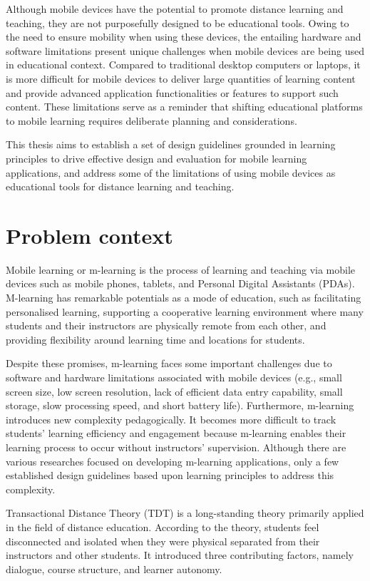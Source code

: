 Although mobile devices have the potential to promote distance learning and teaching, they are not purposefully designed to be educational tools. Owing to the need to ensure mobility when using these devices, the entailing hardware and software limitations present unique challenges when mobile devices are being used in educational context. Compared to traditional desktop computers or laptops, it is more difficult for mobile devices to deliver large quantities of learning content and provide advanced application functionalities or features to support such content. These limitations serve as a reminder that shifting educational platforms to mobile learning requires deliberate planning and considerations. 

This thesis aims to establish a set of design guidelines grounded in learning principles to drive effective design and evaluation for mobile learning applications, and address some of the limitations of using mobile devices as educational tools for distance learning and teaching.

\section{Problem context}
Mobile learning or m-learning is the process of learning and teaching via mobile devices such as mobile phones, tablets, and Personal Digital Assistants (PDAs). M-learning has remarkable potentials as a mode of education, such as facilitating personalised learning, supporting a cooperative learning environment where many students and their instructors are physically remote from each other, and providing flexibility around learning time and locations for students. 

	Despite these promises, m-learning faces some important challenges due to software and hardware limitations associated with mobile devices (e.g., small screen size, low screen resolution, lack of efficient data entry capability, small storage, slow processing speed, and short battery life). Furthermore, m-learning introduces new complexity pedagogically. It becomes more difficult to track students' learning efficiency and engagement because m-learning enables their learning process to occur without instructors' supervision. Although there are various researches focused on developing m-learning applications, only a few established design guidelines based upon learning principles to address this complexity. 

	Transactional Distance Theory (TDT) is a long-standing theory primarily applied in the field of distance education. According to the theory, students feel disconnected and isolated when they were physical separated from their instructors and other students. It introduced three contributing factors, namely dialogue, course structure, and learner autonomy. 

